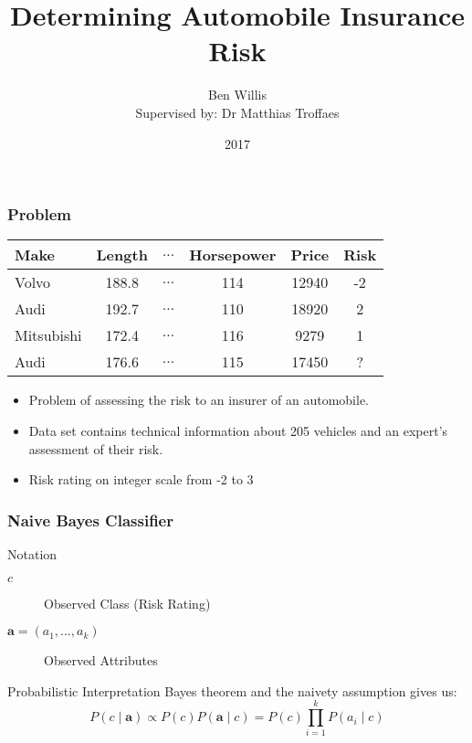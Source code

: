 \documentclass{beamer}
\title{Determining Automobile Insurance Risk}
\author[Ben Willis]{Ben Willis \\ \scriptsize{ Supervised by: Dr Matthias Troffaes}}
\institute{Durham University}
\date{2017}
\begin{document}
 
\frame{\titlepage}

\begin{frame}
	\frametitle{Problem}
	\begin{center}
		\begin{tabular}{l c c c c|c}
			Make       & Length & $\dots$ & Horsepower & Price & Risk \\
			\hline
			Volvo      & 188.8  & $\dots$ & 114        & 12940 & -2   \\
			Audi       & 192.7  & $\dots$ & 110        & 18920 & 2    \\
			Mitsubishi & 172.4  & $\dots$ & 116        & 9279  & 1    \\
			Audi       & 176.6  & $\dots$ & 115        & 17450 & ?
		\end{tabular}
	\end{center}
	\begin{itemize}
		\item Problem of assessing the risk to an insurer of an automobile.
		\item Data set contains technical information about 205 vehicles and an expert's assessment of their risk.
		\item Risk rating on integer scale from -2 to 3
	\end{itemize}
\end{frame}

\begin{frame}
	\frametitle{Naive Bayes Classifier}
	\begin{block}{Notation}
		\begin{description}
			\item[$c$] Observed Class (Risk Rating)
			\item[$\mathbf{a} = (a_1,...,a_k)$] Observed Attributes
		\end{description}
	\end{block}
	\begin{block}{Probabilistic Interpretation}
		Bayes theorem and the naivety assumption gives us:
		\begin{equation}
			P(c \mid \mathbf{a}) \propto P(c)P(\mathbf{a} \mid c) = P(c)\prod_{i=1}^{k}P(a_i \mid c)
		\end{equation}
	\end{block}
\end{frame}
\end{document}
